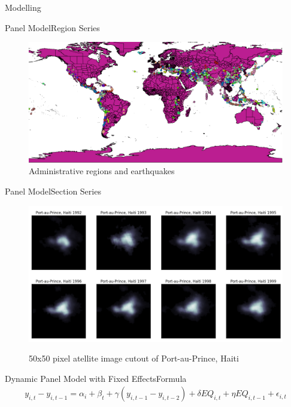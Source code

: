 \documentclass{beamer}
\begin{document}
\begin{section}{Modelling}
  \begin{frame}{Panel Model}{Region Series}
    \begin{figure}
      \centering
      \includegraphics[width=1\linewidth]{world_regions}
      \caption{Administrative regions and earthquakes}\label{eq}
    \end{figure}
  \end{frame}

  \begin{frame}{Panel Model}{Section Series}
    \begin{figure}
      \centering
      \includegraphics[width=\linewidth]{haiti_luminosity_series_short}\label{fig:haiti_luminosity_series_short}
      \caption{50x50 pixel atellite image cutout of Port-au-Prince, Haiti}
    \end{figure}
  \end{frame}

  \begin{frame}{Dynamic Panel Model with Fixed Effects}{Formula}
    \begin{align*}
      y_{i,t}-y_{i,t-1}=\alpha_i+\beta_t+\gamma(y_{i,t-1}-y_{i,t-2})+\delta EQ_{i,t}+\eta EQ_{i,t-1}+\epsilon_{i,t}
    \end{align*}      
  \end{frame}
\end{section}
\end{document}
